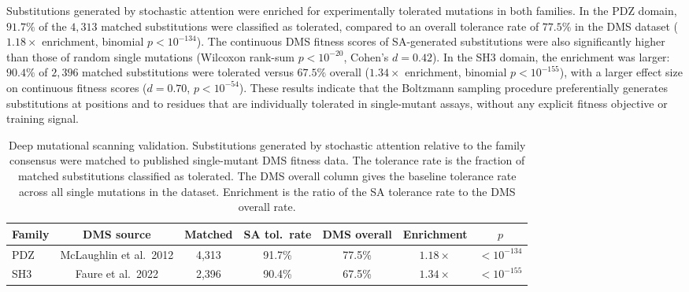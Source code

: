 Substitutions generated by stochastic attention were enriched for experimentally tolerated mutations in both families. In the PDZ domain, $91.7\%$ of the $4{,}313$ matched substitutions were classified as tolerated, compared to an overall tolerance rate of $77.5\%$ in the DMS dataset ($1.18\times$ enrichment, binomial $p < 10^{-134}$). The continuous DMS fitness scores of SA-generated substitutions were also significantly higher than those of random single mutations (Wilcoxon rank-sum $p < 10^{-20}$, Cohen's $d{=}0.42$). In the SH3 domain, the enrichment was larger: $90.4\%$ of $2{,}396$ matched substitutions were tolerated versus $67.5\%$ overall ($1.34\times$ enrichment, binomial $p < 10^{-155}$), with a larger effect size on continuous fitness scores ($d{=}0.70$, $p < 10^{-54}$). These results indicate that the Boltzmann sampling procedure preferentially generates substitutions at positions and to residues that are individually tolerated in single-mutant assays, without any explicit fitness objective or training signal.

\begin{table}[ht]
\centering
\caption{Deep mutational scanning validation. Substitutions generated by stochastic attention relative to the family consensus were matched to published single-mutant DMS fitness data. The tolerance rate is the fraction of matched substitutions classified as tolerated. The DMS overall column gives the baseline tolerance rate across all single mutations in the dataset. Enrichment is the ratio of the SA tolerance rate to the DMS overall rate.}
\label{tab:dms}
\small
\begin{tabular}{@{}lcccccc@{}}
\toprule
Family & DMS source & Matched & SA tol.\ rate & DMS overall & Enrichment & $p$ \\
\midrule
PDZ & McLaughlin et al.\ 2012 & 4{,}313 & 91.7\% & 77.5\% & $1.18\times$ & $<10^{-134}$ \\
SH3 & Faure et al.\ 2022      & 2{,}396 & 90.4\% & 67.5\% & $1.34\times$ & $<10^{-155}$ \\
\bottomrule
\end{tabular}
\end{table}


